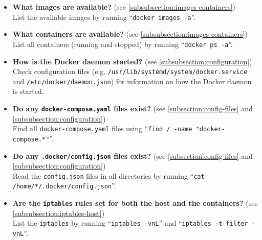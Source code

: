 \begin{itemize}
    \item \textbf{What images are available?} (see \autoref{subsubsection:images-containers})\\
    List the available images by running ``\lstinline{docker images -a}''.

    \item \textbf{What containers are available?} (see \autoref{subsubsection:images-containers})\\
    List all containers (running and stopped) by running ``\lstinline{docker ps -a}''.

    \item \textbf{How is the Docker daemon started?} (see \autoref{subsubsection:configuration})\\
    Check configuration files (e.g. \lstinline{/usr/lib/systemd/system/docker.service} and \lstinline{/etc/docker/daemon.json}) for information on how the Docker daemon is started.

    \item \textbf{Do any \lstinline{docker-compose.yaml} files exist?} (see \autoref{subsection:config-files} and \autoref{subsubsection:configuration})\\
    Find all \lstinline{docker-compose.yaml} files using ``\lstinline{find / -name "docker-compose.*"}''.

    \item \textbf{Do any \lstinline{.docker/config.json} files exist?} (see \autoref{subsection:config-files} and \autoref{subsubsection:configuration})\\
    Read the \lstinline{config.json} files in all directories by running ``\lstinline{cat /home/*/.docker/config.json}''.

    \item \textbf{Are the \lstinline{iptables} rules set for both the host and the containers?} (see \autoref{subsubsection:iptables-host})\\
    List the \lstinline{iptables} by running ``\lstinline{iptables -vnL}'' and ``\lstinline{iptables -t filter -vnL}''.
\end{itemize}

